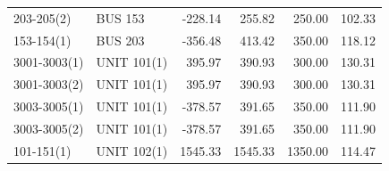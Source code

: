 \documentclass[10pt]{report}
\begin{document}
\begin{table}[H]
{\begin{tabular}{llrrrr}
203-205(2) & BUS 153 & -228.14 & 255.82 & 250.00 & 102.33 \\
153-154(1) & BUS 203 & -356.48 & 413.42 & 350.00 & 118.12 \\
3001-3003(1) & UNIT 101(1) & 395.97 & 390.93 & 300.00 & 130.31 \\
3001-3003(2) & UNIT 101(1) & 395.97 & 390.93 & 300.00 & 130.31 \\
3003-3005(1) & UNIT 101(1) & -378.57 & 391.65 & 350.00 & 111.90 \\
3003-3005(2) & UNIT 101(1) & -378.57 & 391.65 & 350.00 & 111.90 \\
101-151(1) & UNIT 102(1) & 1545.33 & 1545.33 & 1350.00 & 114.47 \\
\bottomrule
\end{tabular}}
\end{table}
\end{document}
